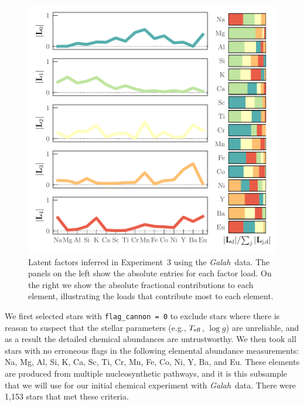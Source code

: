 \documentclass[twocolumn]{aastex62}
\newcommand\teff{T_{\rm eff}}
\newcommand\logg{\log{g}}
\newcommand{\project}[1]{\textsl{#1}}
\newcommand{\Galah}{\project{Galah}}
\begin{document}
\begin{figure}
	\includegraphics[width=\textwidth]{experiments/exp9-log-xfe-offset-latent-factors-visualize-abs.pdf}
	\caption{Latent factors inferred in Experiment~3 using the \Galah\
			 data. The panels on the left show the absolute entries for each
			 factor load. On the right we show the absolute fractional contributions
			 to each element, illustrating the loads that contribute most to each
			 element.}
    \label{fig:exp9-factor-loads}
\end{figure}



We first selected stars with \texttt{flag\_cannon = 0} to exclude
stars where there is reason to suspect that the stellar parameters
(e.g., $\teff$, $\logg$) are unreliable, and as a result the 
detailed chemical abundances are untrustworthy. We then took all
stars with no erroneous flags in the following elemental abundance
measurements: Na, Mg, Al, Si, K, Ca, Sc, Ti, Cr, Mn, Fe, Co, Ni, Y, Ba, and Eu.
These elements are produced from multiple nucleosynthetic
pathways, and it is this subsample that we will use for 
our initial chemical experiment with \Galah\ data.
There were 1,153 stars that met these criteria. 

\end{document}
